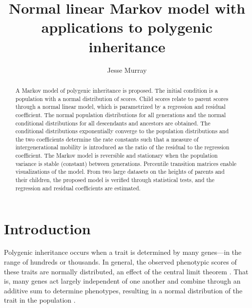 \documentclass{svproc} %
\begin{document}
\mainmatter              %

\title{Normal linear Markov model with applications to polygenic inheritance}

\author{Jesse Murray}



\maketitle   %

\begin{abstract} %
A Markov model of polygenic inheritance is proposed. The initial condition is a population with a normal distribution of scores. Child scores relate to parent scores through a normal linear model, which is parametrized by a regression and residual coefficient. The normal population distributions for all generations and the normal conditional distributions for all descendants and ancestors are obtained. The conditional distributions exponentially converge to the population distributions and the two coefficients determine the rate constants such that a measure of intergenerational mobility is introduced as the ratio of the residual to the regression coefficient. The Markov model is reversible and stationary when the population variance is stable (constant) between generations. Percentile transition matrices enable visualizations of the model. From two large datasets on the heights of parents and their children, the proposed model is verified through statistical tests, and the regression and residual coefficients are estimated.
%
\end{abstract}



\section{Introduction}

Polygenic inheritance occurs when a trait is determined by many genes---in the range of hundreds or thousands. In general, the observed phenotypic scores of these traits are normally distributed, an effect of the central limit theorem \cite{rieger, lange_article}. That is, many genes act largely independent of one another and combine through an additive sum to determine phenotypes, resulting in a normal distribution of the trait in the population \cite{lange_book}. 
\end{document}
